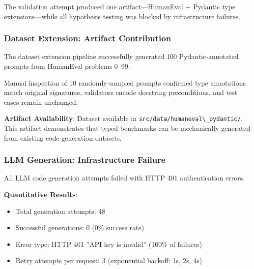 
The validation attempt produced one artifact---HumanEval + Pydantic type extensions---while all hypothesis testing was blocked by infrastructure failures.

\subsubsection{Dataset Extension: Artifact Contribution}

The dataset extension pipeline successfully generated 100 Pydantic-annotated prompts from HumanEval problems 0--99.

\begin{table}[htbp]
\centering
{}
\end{table}

Manual inspection of 10 randomly-sampled prompts confirmed type annotations match original signatures, validators encode docstring preconditions, and test cases remain unchanged.

\textbf{Artifact Availability}: Dataset available in \texttt{src/data/humaneval\textbackslash \_pydantic/}. This artifact demonstrates that typed benchmarks can be mechanically generated from existing code generation datasets.

\subsubsection{LLM Generation: Infrastructure Failure}

All LLM code generation attempts failed with HTTP 401 authentication errors.

\textbf{Quantitative Results}:
\begin{itemize}
\item Total generation attempts: 48
\item Successful generations: 0 (0\% success rate)
\item Error type: HTTP 401 ''API key is invalid'' (100\% of failures)
\item Retry attempts per request: 3 (exponential backoff: 1s, 2s, 4s)
\end{itemize}

